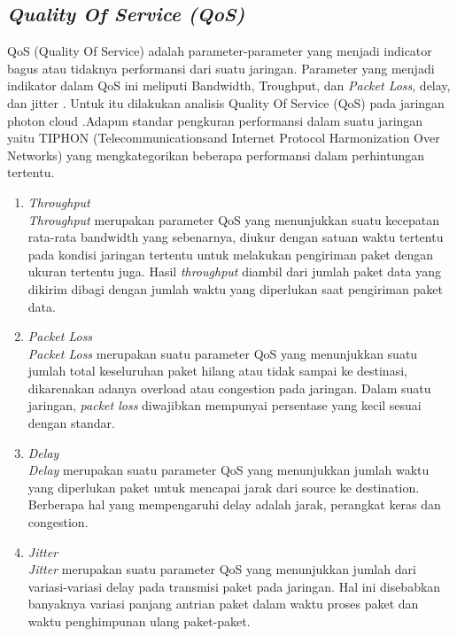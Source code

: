 \subsection{\textit{Quality Of Service (QoS)}}
\noindent

QoS (Quality Of Service) adalah parameter-parameter yang menjadi indicator bagus atau
tidaknya performansi dari suatu jaringan. Parameter
yang menjadi indikator dalam QoS ini meliputi 
Bandwidth, Troughput, dan \textit{Packet Loss}, delay, dan
jitter \cite{qos}. Untuk itu dilakukan analisis Quality Of
Service (QoS) pada jaringan photon cloud .Adapun 
standar pengkuran performansi dalam suatu jaringan 
yaitu TIPHON (Telecommunicationsand Internet 
Protocol Harmonization Over Networks) yang 
mengkategorikan beberapa performansi dalam 
perhintungan tertentu.

\begin{enumerate}
	\item \textit{\textit{Throughput}} \\
	\textit{Throughput} merupakan parameter QoS yang 
menunjukkan suatu kecepatan rata-rata bandwidth
yang sebenarnya, diukur dengan satuan waktu 
tertentu pada kondisi jaringan tertentu untuk 
melakukan pengiriman paket dengan ukuran tertentu 
juga. Hasil \textit{throughput} diambil dari jumlah paket 
data yang dikirim dibagi dengan jumlah waktu yang 
diperlukan saat pengiriman paket data.
	\item \textit{Packet Loss} \\
	\textit{Packet Loss} merupakan suatu parameter QoS 
yang menunjukkan suatu jumlah total keseluruhan 
paket hilang atau tidak sampai ke destinasi, 
dikarenakan adanya overload atau congestion pada 
jaringan. Dalam suatu jaringan, \textit{packet loss}
diwajibkan mempunyai persentase yang kecil sesuai 
dengan standar. 
\item \textit{Delay} \\
\textit{Delay} merupakan suatu parameter QoS yang 
menunjukkan jumlah waktu yang diperlukan paket 
untuk mencapai jarak dari source ke destination. 
Berberapa hal yang mempengaruhi delay adalah 
jarak, perangkat keras dan congestion. 
\item \textit{Jitter}\\
\textit{Jitter} merupakan suatu parameter QoS yang 
menunjukkan jumlah dari variasi-variasi delay pada 
transmisi paket pada jaringan. Hal ini disebabkan 
banyaknya variasi panjang antrian paket dalam 
waktu proses paket dan waktu penghimpunan ulang 
paket-paket.

\end{enumerate}

